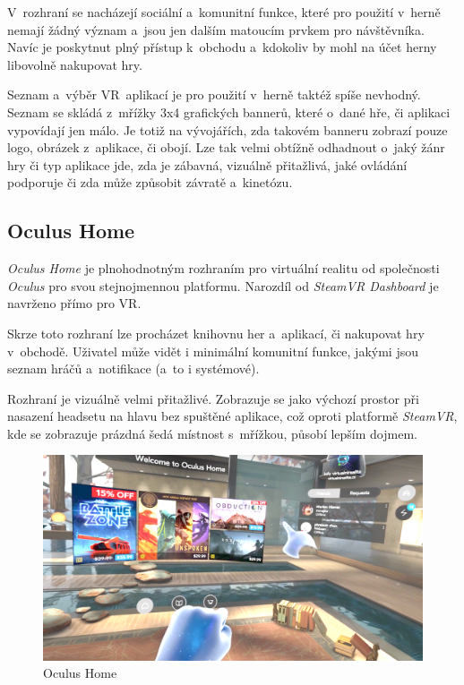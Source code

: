 V~rozhraní se nacházejí
sociální a~komunitní funkce, které pro použití v~herně nemají žádný
význam a~jsou jen dalším matoucím prvkem pro návštěvníka. Navíc je poskytnut
plný přístup k~obchodu a~kdokoliv by mohl na účet herny libovolně
nakupovat hry.

Seznam a~výběr VR~aplikací je pro použití v~herně taktéž spíše nevhodný.
Seznam se skládá z~mřížky 3x4 grafických bannerů, které o~dané hře, či aplikaci 
vypovídají jen málo. Je totiž na vývojářích, zda takovém banneru
zobrazí pouze logo, obrázek z~aplikace, či obojí. Lze tak velmi obtížně
odhadnout o~jaký žánr hry či typ aplikace jde, zda je zábavná, vizuálně přitažlivá, jaké
ovládání podporuje či zda může způsobit závratě a~kinetózu.

\subsection{Oculus Home}\label{oculus-home}

\emph{Oculus Home} je plnohodnotným rozhraním pro virtuální realitu od
společnosti \emph{Oculus} pro svou stejnojmennou platformu. Narozdíl od
\emph{SteamVR Dashboard} je navrženo přímo pro VR.

Skrze toto rozhraní lze procházet knihovnu her a~aplikací, či nakupovat hry
v~obchodě. Uživatel může vidět i minimální komunitní funkce, jakými jsou
seznam hráčů a~notifikace (a~to i systémové).

Rozhraní je vizuálně velmi přitažlivé. Zobrazuje se jako výchozí prostor
při nasazení headsetu na hlavu bez spuštěné aplikace, což oproti platformě
\emph{SteamVR}, kde se zobrazuje prázdná šedá místnost s~mřížkou, působí lepším
dojmem.

\begin{figure}[h!]
\centering
\includegraphics[width=12cm]{src/assets/oculus-home.png}
\caption{Oculus Home}
\end{figure}

